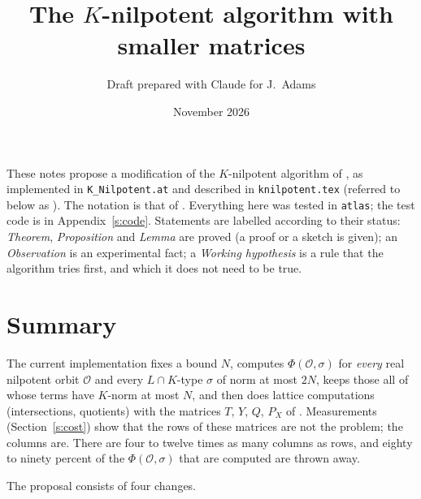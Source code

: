 \documentclass[11pt,leqno]{article}
\theoremstyle{definition}
\numberwithin{equation}{section}
\newcommand{\Ob}{\mathcal O}
\newcommand{\at}[1]{\texttt{#1}}
\begin{document}
\title{The $K$-nilpotent algorithm with smaller matrices}
\author{Draft prepared with Claude for J.~Adams}
\date{November 2026}
\maketitle

These notes propose a modification of the $K$-nilpotent algorithm of
\cite{AV}, as implemented in \at{K\_Nilpotent.at} and described in
\at{knilpotent.tex} (referred to below as \cite{KN}).  The notation is that of
\cite{KN}.  Everything here was tested in \at{atlas}; the test code is in
Appendix~\ref{s:code}.  Statements are labelled according to their status:
\emph{Theorem}, \emph{Proposition} and \emph{Lemma} are proved (a proof
or a sketch is given); an \emph{Observation} is an experimental fact;
a \emph{Working hypothesis} is a rule that the algorithm tries first, and
which it does not need to be true.

\section{Summary}
\label{s:summary}

The current implementation fixes a bound $N$, computes $\Phi(\Ob,\sigma)$ for
\emph{every} real nilpotent orbit $\Ob$ and every $L\cap K$-type $\sigma$ of
norm at most $2N$, keeps those all of whose terms have $K$-norm at most $N$,
and then does lattice computations (intersections, quotients) with the
matrices $T$, $Y$, $Q$, $P_X$ of \cite[Section~12]{KN}.  Measurements
(Section~\ref{s:cost}) show that the rows of these matrices are not the
problem; the columns are.  There are four to twelve times as many columns as
rows, and eighty to ninety percent of the $\Phi(\Ob,\sigma)$ that are
computed are thrown away.

The proposal consists of four changes.
\end{document}
